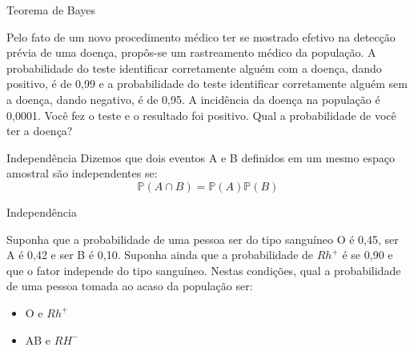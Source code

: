 


\begin{frame}{Teorema de Bayes}
\begin{exemplo}[6]
        Pelo fato de um novo procedimento médico ter se mostrado efetivo na detecção prévia de uma doença, propôs-se um rastreamento médico da população. A probabilidade do teste identificar corretamente alguém com a doença, dando positivo, é de 0,99 e a probabilidade do teste identificar corretamente alguém sem a doença, dando negativo, é de 0,95. A incidência da doença na população é 0,0001. Você fez o teste e o resultado foi positivo. Qual a probabilidade de você ter a doença?
\end{exemplo}

\end{frame}

\begin{frame}{Independência}
    Dizemos que dois eventos A e B definidos em um mesmo espaço amostral são independentes se:
    $$\mathds{P}(A\cap B) = \mathds{P}(A) \mathds{P}(B)$$
\end{frame}

\begin{frame}{Independência}
\begin{exemplo}[7]
    Suponha que a probabilidade de uma pessoa ser do tipo sanguíneo O é 0,45, ser A é 0,42 e ser B é 0,10. Suponha ainda que a probabilidade de $Rh^+$ é se 0,90 e que o fator independe do tipo sanguíneo. Nestas condições, qual a probabilidade de uma pessoa tomada ao acaso da população ser:

    \begin{itemize}
        \item O e $Rh^+$
        \item AB e $RH^-$
    \end{itemize}
\end{exemplo}
    
\end{frame}

